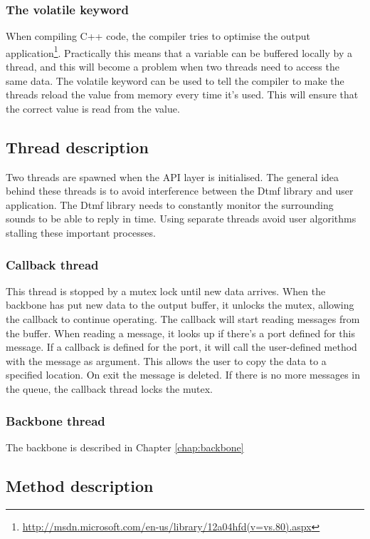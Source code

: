 \subsubsection{The volatile keyword}
When compiling C++ code, the compiler tries to optimise the output application\footnote{\url{http://msdn.microsoft.com/en-us/library/12a04hfd(v=vs.80).aspx}}. Practically this means that a variable can be buffered locally by a thread, and this will become a problem when two threads need to access the same data. The volatile keyword can be used to tell the compiler to make the threads reload the value from memory every time it's used. This will ensure that the correct value is read from the value.

\subsection{Thread description}
\label{api_thread_description}
Two threads are spawned when the API layer is initialised. The general idea behind these threads is to avoid interference between the Dtmf library and user application. The Dtmf library needs to constantly monitor the surrounding sounds to be able to reply in time. Using separate threads avoid user algorithms stalling these important processes.

\subsubsection{Callback thread}
This thread is stopped by a mutex lock until new data arrives. When the backbone has put new data to the output buffer, it unlocks the mutex, allowing the callback to continue operating. The callback will start reading messages from the buffer. When reading a message, it looks up if there's a port defined for this message. If a callback is defined for the port, it will call the user-defined method with the message as argument. This allows the user to copy the data to a specified location. On exit the message is deleted. If there is no more messages in the queue, the callback thread locks the mutex.

\subsubsection{Backbone thread}
The backbone is described in Chapter \ref{chap:backbone}

\subsection{Method description}
\label{sub:api_method_description}
